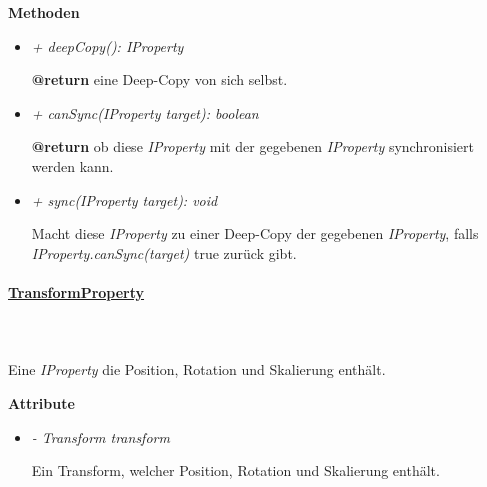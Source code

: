             \textbf{Methoden}
            \begin{itemize}
                \item \textit{+ deepCopy(): IProperty}
                    \begin{leftbar}[0.9\linewidth]
                        \textbf{@return} eine Deep-Copy von sich selbst.
                    \end{leftbar}
                \item \textit{+ canSync(IProperty target): boolean}
                    \begin{leftbar}[0.9\linewidth]
                        \textbf{@return} ob diese \textit{IProperty} mit der gegebenen \textit{IProperty} synchronisiert werden kann.
                    \end{leftbar}
                \item \textit{+ sync(IProperty target): void}
                    \begin{leftbar}[0.9\linewidth]
                        Macht diese \textit{IProperty} zu einer Deep-Copy der gegebenen \textit{IProperty}, falls \textit{IProperty.canSync(target)} true zurück gibt.
                    \end{leftbar}
            \end{itemize}

        \paragraph{\underline{TransformProperty}} \mbox{}\\
        \\
            Eine \textit{IProperty} die Position, Rotation und Skalierung enthält.\par

            \textbf{Attribute}
            \begin{itemize}
                \item \textit{- Transform transform}
                    \begin{leftbar}[0.9\linewidth]
                        Ein Transform, welcher Position, Rotation und Skalierung enthält.
                    \end{leftbar}
            \end{itemize}


